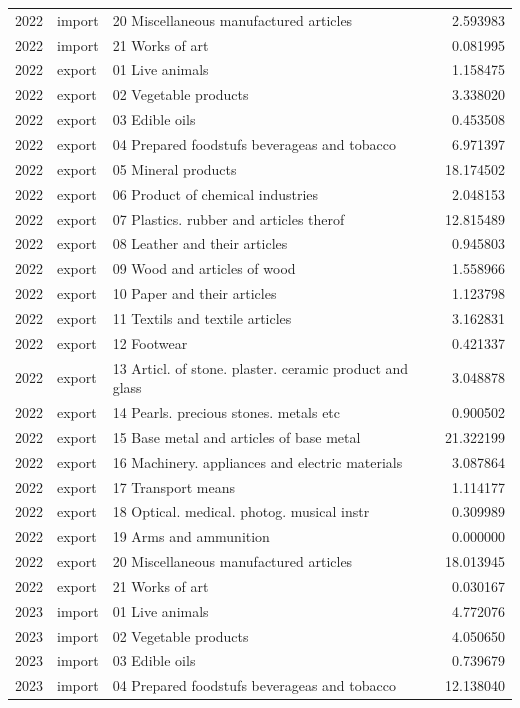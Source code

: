 \begin{tabular}{rllr}
2022 & import & 20 Miscellaneous manufactured articles & 2.593983 \\
2022 & import & 21 Works of art & 0.081995 \\
2022 & export & 01 Live animals & 1.158475 \\
2022 & export & 02 Vegetable products & 3.338020 \\
2022 & export & 03 Edible oils & 0.453508 \\
2022 & export & 04 Prepared foodstufs beverageas and tobacco & 6.971397 \\
2022 & export & 05 Mineral products & 18.174502 \\
2022 & export & 06 Product of chemical industries & 2.048153 \\
2022 & export & 07 Plastics. rubber and articles therof & 12.815489 \\
2022 & export & 08 Leather and their articles & 0.945803 \\
2022 & export & 09 Wood and articles of wood & 1.558966 \\
2022 & export & 10 Paper and their articles & 1.123798 \\
2022 & export & 11 Textils and textile articles & 3.162831 \\
2022 & export & 12 Footwear & 0.421337 \\
2022 & export & 13 Articl. of stone. plaster. ceramic product and glass & 3.048878 \\
2022 & export & 14 Pearls. precious stones. metals etc & 0.900502 \\
2022 & export & 15 Base metal and articles of base metal & 21.322199 \\
2022 & export & 16 Machinery. appliances and electric materials & 3.087864 \\
2022 & export & 17 Transport means & 1.114177 \\
2022 & export & 18 Optical. medical. photog. musical instr & 0.309989 \\
2022 & export & 19 Arms and ammunition & 0.000000 \\
2022 & export & 20 Miscellaneous manufactured articles & 18.013945 \\
2022 & export & 21 Works of art & 0.030167 \\
2023 & import & 01 Live animals & 4.772076 \\
2023 & import & 02 Vegetable products & 4.050650 \\
2023 & import & 03 Edible oils & 0.739679 \\
2023 & import & 04 Prepared foodstufs beverageas and tobacco & 12.138040 \\

\end{tabular}

